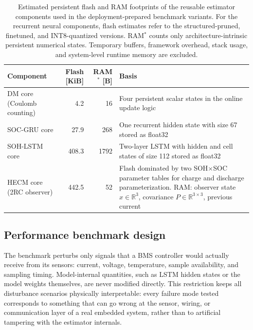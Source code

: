 \documentclass[
    a4paper,
    12pt,
    titlepage,
    bibliography=totoc,
    twoside=on,
    parskip=false,
    numbers=noenddot,
    cleardoublepage=empty,
    DIV=12,
    BCOR=12.0mm,
    headheight=36pt,
    headings=openright
]{scrreprt}
\begin{document}
\begin{table}[H]
    \centering
    \small
    \caption[Reusable estimator-component footprints.]{Estimated persistent flash and RAM footprints of the reusable estimator components used in the deployment-prepared benchmark variants. For the recurrent neural components, flash estimates refer to the structured-pruned, finetuned, and INT8-quantized versions. RAM$^{*}$ counts only architecture-intrinsic persistent numerical states. Temporary buffers, framework overhead, stack usage, and system-level runtime memory are excluded.}
    \label{tab:robust_component_footprints}
    \begin{tabularx}{\textwidth}{>{\raggedright\arraybackslash}p{3.4cm}rr>{\raggedright\arraybackslash}X}
        \toprule
        Component & Flash [KiB] & RAM$^{*}$ [B] & Basis \\
        \midrule
        DM core (Coulomb counting) & 4.2 & 16 & Four persistent scalar states in the online update logic \\
        SOC-GRU core & 27.9 & 268 & One recurrent hidden state with size 67 stored as float32 \\
        SOH-LSTM core & 408.3 & 1792 & Two-layer LSTM with hidden and cell states of size 112 stored as float32 \\
        HECM core (2RC observer) & 442.5 & 52 & Flash dominated by two SOH$\times$SOC parameter tables for charge and discharge parameterization. RAM: observer state $x \in \mathbb{R}^{3}$, covariance $P \in \mathbb{R}^{3 \times 3}$, previous current \\
        \bottomrule
    \end{tabularx}
\end{table}

\subsection{Performance benchmark design}
The benchmark perturbs only signals that a BMS controller would actually receive from its sensors: current, voltage, temperature, sample availability, and sampling timing. Model-internal quantities, such as LSTM hidden states or the model weights themselves, are never modified directly. This restriction keeps all disturbance scenarios physically interpretable: every failure mode tested corresponds to something that can go wrong at the sensor, wiring, or communication layer of a real embedded system, rather than to artificial tampering with the estimator internals.\autocite{bergerBenchmarkingBatteryManagement2024}
\end{document}
